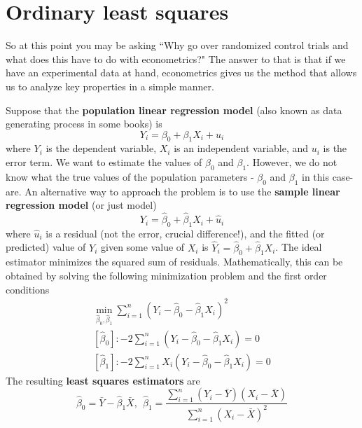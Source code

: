 \documentclass[12pt]{article}
\theoremstyle{definition}
\theoremstyle{property}
\theoremstyle{assumption}
\theoremstyle{example}
\theoremstyle{comment}
\begin{document}
\section{Ordinary least squares}
So at this point you may be asking ``Why go over randomized control trials and what does this have to do with econometrics?" The answer to that is that if we have an experimental data at hand, econometrics gives us the method that allows us to analyze key properties in a simple manner. 
\par
Suppose that the \textbf{population linear regression model} (also known as data generating process in some books) is
\[
Y_i = \beta_0 + \beta_1X_i + u_i
\]
where $Y_i$ is the dependent variable, $X_i$ is an independent variable, and $u_i$ is the error term. We want to estimate the values of $\beta_0$ and $\beta_1$. However, we do not know what the true values of the population parameters - $\beta_0$ and $\beta_1$ in this case- are. An alternative way to approach the problem is to use the \textbf{sample linear regression model} (or just model)
\[
Y_i = \hat{\beta}_0 +\hat{\beta}_1X_i +\hat{u}_i
\]
where $\hat{u}_i$ is a residual (not the error, crucial difference!), and the fitted (or predicted) value of $Y_i$ given some value of $X_i$ is $\hat{Y}_i= \hat{\beta}_0 +\hat{\beta}_1X_i$. The ideal estimator minimizes the squared sum of residuals. Mathematically, this can be obtained by solving the following minimization problem and the first order conditions
\footnotesize{\begin{gather*}
\min_{\hat{\beta}_0, \hat{\beta}_1} \sum_{i=1}^n (Y_i-\hat{\beta}_0 - \hat{\beta}_1X_i)^2\\
[\hat{\beta}_0]: -2\sum_{i=1}^n(Y_i-\hat{\beta}_0-\hat{\beta}_1X_i)=0\\
[\hat{\beta}_1]: -2\sum_{i=1}^nX_i(Y_i-\hat{\beta}_0-\hat{\beta}_1X_i)=0 
\end{gather*}}\normalsize
The resulting \textbf{least squares estimators} are
\[
\hat{\beta}_0 = \bar{Y}-\hat{\beta}_1\bar{X}, \ \ \hat{\beta}_1=\frac{\sum_{i=1}^n(Y_i-\bar{Y})(X_i-\bar{X})}{\sum_{i=1}^n(X_i-\bar{X})^2}
\]
\end{document}
